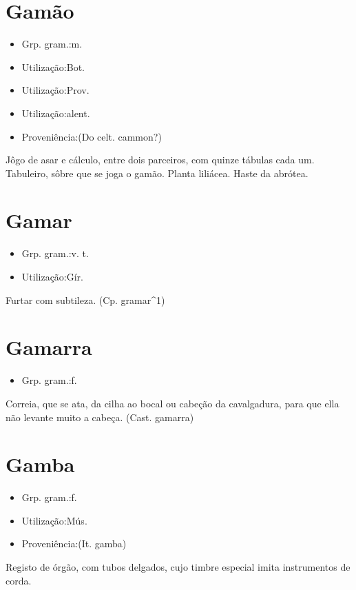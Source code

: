 \section{Gamão}
\begin{itemize}
\item {Grp. gram.:m.}
\end{itemize}
\begin{itemize}
\item {Utilização:Bot.}
\end{itemize}
\begin{itemize}
\item {Utilização:Prov.}
\end{itemize}
\begin{itemize}
\item {Utilização:alent.}
\end{itemize}
\begin{itemize}
\item {Proveniência:(Do celt. \textunderscore cammon\textunderscore ?)}
\end{itemize}
Jôgo de asar e cálculo, entre dois parceiros, com quinze tábulas cada um.
Tabuleiro, sôbre que se joga o gamão.
Planta liliácea.
Haste da abrótea.
\section{Gamar}
\begin{itemize}
\item {Grp. gram.:v. t.}
\end{itemize}
\begin{itemize}
\item {Utilização:Gír.}
\end{itemize}
Furtar com subtileza.
(Cp. \textunderscore gramar\textunderscore ^1)
\section{Gamarra}
\begin{itemize}
\item {Grp. gram.:f.}
\end{itemize}
Correia, que se ata, da cilha ao bocal ou cabeção da cavalgadura, para que ella não levante muito a cabeça.
(Cast. \textunderscore gamarra\textunderscore )
\section{Gamba}
\begin{itemize}
\item {Grp. gram.:f.}
\end{itemize}
\begin{itemize}
\item {Utilização:Mús.}
\end{itemize}
\begin{itemize}
\item {Proveniência:(It. \textunderscore gamba\textunderscore )}
\end{itemize}
Registo de órgão, com tubos delgados, cujo timbre especial imita instrumentos de corda.
